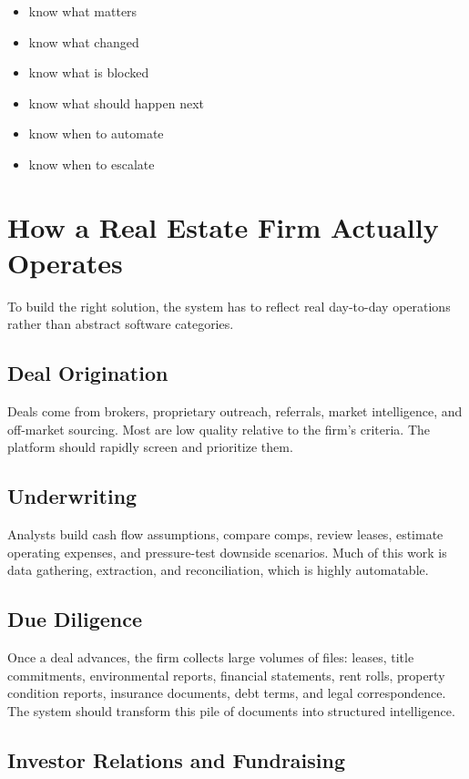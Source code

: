 \documentclass[11pt]{article}
\begin{document}
\begin{itemize}
\item know what matters
\item know what changed
\item know what is blocked
\item know what should happen next
\item know when to automate
\item know when to escalate
\end{itemize}

\section{How a Real Estate Firm Actually Operates}

To build the right solution, the system has to reflect real day-to-day operations rather than abstract software categories.

\subsection{Deal Origination}

Deals come from brokers, proprietary outreach, referrals, market intelligence, and off-market sourcing. Most are low quality relative to the firm's criteria. The platform should rapidly screen and prioritize them.

\subsection{Underwriting}

Analysts build cash flow assumptions, compare comps, review leases, estimate operating expenses, and pressure-test downside scenarios. Much of this work is data gathering, extraction, and reconciliation, which is highly automatable.

\subsection{Due Diligence}

Once a deal advances, the firm collects large volumes of files: leases, title commitments, environmental reports, financial statements, rent rolls, property condition reports, insurance documents, debt terms, and legal correspondence. The system should transform this pile of documents into structured intelligence.

\subsection{Investor Relations and Fundraising}
\end{document}
